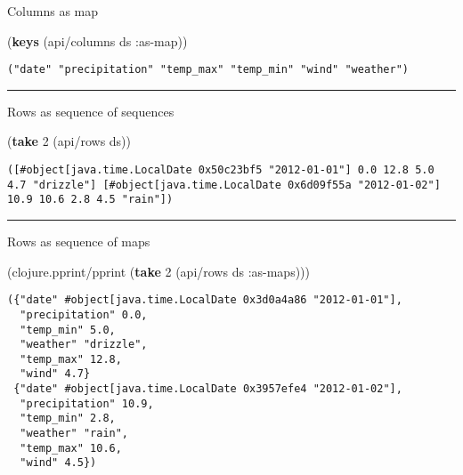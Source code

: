 \documentclass[]{article}
\newenvironment{Shaded}{\begin{snugshade}}{\end{snugshade}}
\newcommand{\AttributeTok}[1]{\textcolor[rgb]{0.77,0.63,0.00}{#1}}
\newcommand{\DecValTok}[1]{\textcolor[rgb]{0.00,0.00,0.81}{#1}}
\newcommand{\KeywordTok}[1]{\textcolor[rgb]{0.13,0.29,0.53}{\textbf{#1}}}
\newcommand{\NormalTok}[1]{#1}
\begin{document}
Columns as map

\begin{Shaded}
\begin{Highlighting}[]
\NormalTok{(}\KeywordTok{keys}\NormalTok{ (api/columns ds }\AttributeTok{:as-map}\NormalTok{))}
\end{Highlighting}
\end{Shaded}

\begin{verbatim}
("date" "precipitation" "temp_max" "temp_min" "wind" "weather")
\end{verbatim}

\begin{center}\rule{0.5\linewidth}{0.5pt}\end{center}

Rows as sequence of sequences

\begin{Shaded}
\begin{Highlighting}[]
\NormalTok{(}\KeywordTok{take} \DecValTok{2}\NormalTok{ (api/rows ds))}
\end{Highlighting}
\end{Shaded}

\begin{verbatim}
([#object[java.time.LocalDate 0x50c23bf5 "2012-01-01"] 0.0 12.8 5.0 4.7 "drizzle"] [#object[java.time.LocalDate 0x6d09f55a "2012-01-02"] 10.9 10.6 2.8 4.5 "rain"])
\end{verbatim}

\begin{center}\rule{0.5\linewidth}{0.5pt}\end{center}

Rows as sequence of maps

\begin{Shaded}
\begin{Highlighting}[]
\NormalTok{(clojure.pprint/pprint (}\KeywordTok{take} \DecValTok{2}\NormalTok{ (api/rows ds }\AttributeTok{:as-maps}\NormalTok{)))}
\end{Highlighting}
\end{Shaded}

\begin{verbatim}
({"date" #object[java.time.LocalDate 0x3d0a4a86 "2012-01-01"],
  "precipitation" 0.0,
  "temp_min" 5.0,
  "weather" "drizzle",
  "temp_max" 12.8,
  "wind" 4.7}
 {"date" #object[java.time.LocalDate 0x3957efe4 "2012-01-02"],
  "precipitation" 10.9,
  "temp_min" 2.8,
  "weather" "rain",
  "temp_max" 10.6,
  "wind" 4.5})
\end{verbatim}
\end{document}
